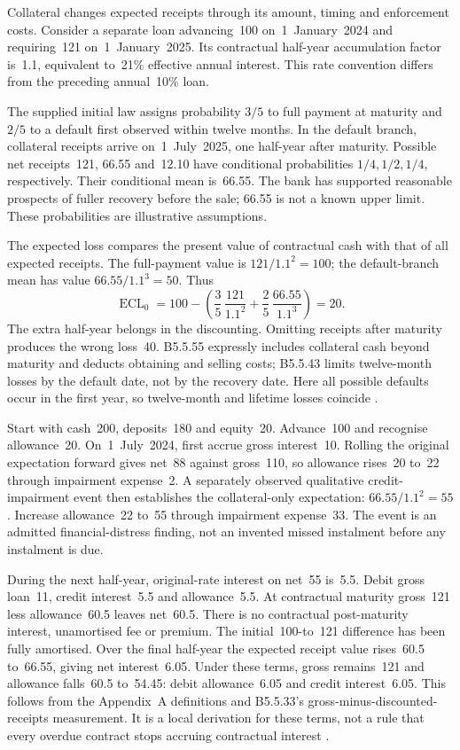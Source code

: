 Collateral changes expected receipts through its amount, timing and
enforcement costs. Consider a separate loan advancing~100 on~1~January~2024
and requiring~121 on~1~January~2025. Its contractual half-year accumulation
factor is~1.1, equivalent to~21\% effective annual interest. This rate
convention differs from the preceding annual~10\% loan.

The supplied initial law assigns probability $3/5$ to full payment at maturity
and $2/5$ to a default first observed within twelve months. In the default
branch, collateral receipts arrive on~1~July~2025, one half-year after maturity.
Possible net receipts~121, 66.55 and~12.10 have conditional probabilities
$1/4,1/2,1/4$, respectively. Their conditional mean is~66.55. The bank has
supported reasonable prospects of fuller recovery before the sale; 66.55 is
not a known upper limit. These probabilities are illustrative assumptions.

The expected loss compares the present value of contractual cash with that
of all expected receipts. The full-payment value is $121/1.1^2=100$; the
default-branch mean has value $66.55/1.1^3=50$. Thus
\[
 \operatorname{ECL}_0
 =100-\left(\frac{3}{5}\,\frac{121}{1.1^2}
              +\frac{2}{5}\,\frac{66.55}{1.1^3}\right)=20.
\]
The extra half-year belongs in the discounting. Omitting receipts after
maturity produces the wrong loss~40. B5.5.55 expressly includes collateral
cash beyond maturity and deducts obtaining and selling costs; B5.5.43
limits twelve-month losses by the default date, not by the recovery date.
Here all possible defaults occur in the first year, so twelve-month and
lifetime losses coincide \citep[B5.5.43--44 and B5.5.55]{aasb9dated}.

Start with cash~200, deposits~180 and equity~20. Advance~100 and recognise
allowance~20. On~1~July~2024, first accrue gross interest~10. Rolling the
original expectation forward gives net~88 against gross~110, so allowance
rises~20 to~22 through impairment expense~2. A separately observed qualitative
credit-impairment event then establishes the collateral-only expectation:
$66.55/1.1^2=55$. Increase allowance~22 to~55 through impairment expense~33.
The event is an admitted financial-distress finding, not an invented missed
instalment before any instalment is due.

During the next half-year, original-rate interest on net~55 is~5.5.
Debit gross loan~11, credit interest~5.5 and allowance~5.5. At contractual
maturity gross~121 less allowance~60.5 leaves net~60.5. There is no contractual
post-maturity interest, unamortised fee or premium. The initial~100-to~121
difference has been fully amortised. Over the final half-year the expected
receipt value rises~60.5 to~66.55, giving net interest~6.05. Under these terms,
gross remains~121 and allowance falls~60.5 to~54.45: debit allowance~6.05 and
credit interest~6.05. This follows from the Appendix~A definitions and
B5.5.33's gross-minus-discounted-receipts measurement. It is a local derivation
for these terms, not a rule that every overdue contract stops accruing
contractual interest \citep[Appendix~A, paragraph~5.4.1(b), B5.5.33]{aasb9dated}.

